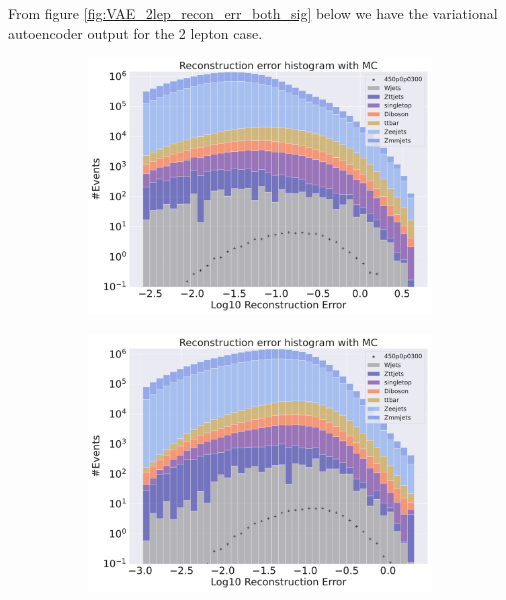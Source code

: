 From figure \ref{fig:VAE_2lep_recon_err_both_sig} below we have the variational autoencoder output for the 2 lepton case. 

\begin{figure}[H]
    \centering
    \begin{subfigure}{.45\textwidth}
        \includegraphics[width=\textwidth]{Figures/VAE_testing/big/2lep/b_data_recon_big_rm3_feats_sig_450p0p0300_.pdf}
        \caption{ }
        \label{fig:VAE_2lep_big_450}
    \end{subfigure}
    \hfill
    \begin{subfigure}{.45\textwidth}
        \includegraphics[width=\textwidth]{Figures/VAE_testing/small/2lep/b_data_recon_big_rm3_feats_sig_450p0p0300_.pdf}

\end{subfigure}
\end{figure}

